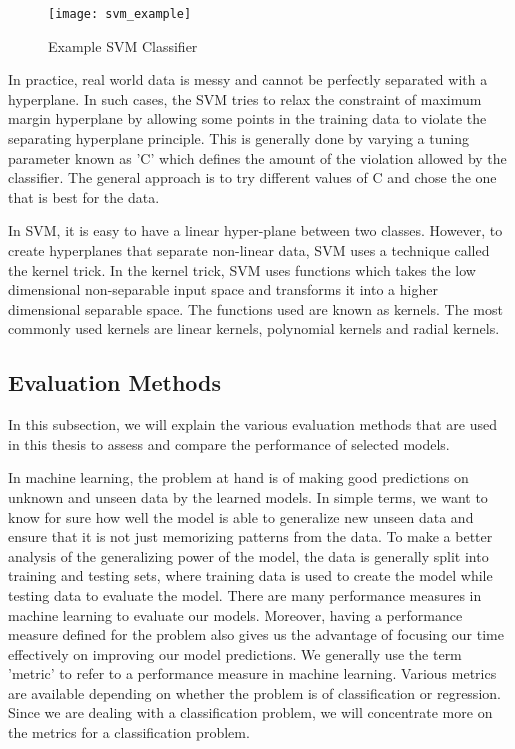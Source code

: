 \documentclass[11pt,openright]{report}
\begin{document}
  \begin{figure}
	\centering
	\texttt{[image: svm\_example]}
	\caption{Example SVM Classifier}
	\label{fig:svm_example}
\end{figure} 

In practice, real world data is messy and cannot be perfectly separated with a hyperplane. In such cases, the SVM tries to relax the constraint of maximum margin hyperplane by allowing some points in the training data to violate the separating hyperplane principle. This is generally done by varying a tuning parameter known as 'C' which defines the amount of the violation allowed by the classifier. The general approach is to try different values of C and chose the one that is best for the data.

In SVM, it is easy to have a linear hyper-plane between two classes. However, to create hyperplanes that separate non-linear data, SVM uses a technique called the kernel trick. In the kernel trick, SVM uses functions which takes the low dimensional non-separable input space and transforms it into a higher dimensional separable space. The functions used are known as kernels. The most commonly used kernels are linear kernels, polynomial kernels and radial kernels. 

\subsection {Evaluation Methods}
In this subsection, we will explain the various evaluation methods that are used in this thesis to assess and compare the performance of selected models.

In machine learning, the problem at hand is of making good predictions on unknown and unseen data by the learned models. In simple terms, we want to know for sure how well the model is able to generalize new unseen data and ensure that it is not just memorizing patterns from the data. To make a better analysis of the generalizing power of the model, the data is generally split into training and testing sets, where training data is used to create the model while testing data to evaluate the model. There are many performance measures in machine learning to evaluate our models. Moreover, having a performance measure defined for the problem also gives us the advantage of focusing our time effectively on improving our model predictions. We generally use the term 'metric' to refer to a performance measure in machine learning. Various metrics are available depending on whether the problem is of classification or regression. Since we are dealing with a classification problem, we will concentrate more on the metrics for a classification problem.
\end{document}
